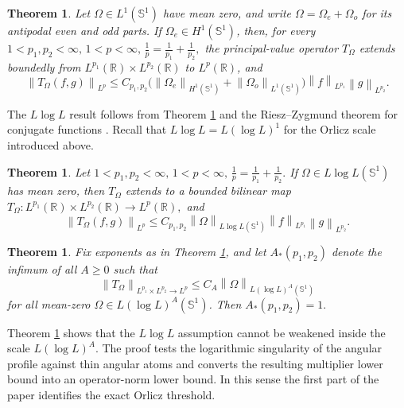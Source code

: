\documentclass[11pt]{amsart}
\newtheorem{theorem}[definition]{Theorem}
\theoremstyle{remark}
\numberwithin{equation}{section}
\newcommand{\R}{\mathbb R}
\newcommand{\Sph}{\mathbb S^1}
\newcommand{\norm}[1]{\left\lVert #1\right\rVert}
\begin{document}
	\begin{theorem}
		\label{thm:rotational-main}
		Let \(\Omega\in L^1(\Sph)\) have mean zero, and write
		\(\Omega=\Omega_e+\Omega_o\) for its antipodal even and odd parts. If 
		\(\Omega_e\in H^1(\Sph)\), then, for every
		$
		1<p_1,p_2<\infty,\,
		1<p<\infty,\,
		\frac1p=\frac1{p_1}+\frac1{p_2},
		$
		the principal-value operator \(T_\Omega\) extends boundedly from
		\(L^{p_1}(\R)\times L^{p_2}(\R)\) to \(L^p(\R)\), and
		\[
		\norm{T_\Omega(f,g)}_{L^p}
		\le
		C_{p_1,p_2}
		\bigl(\norm{\Omega_e}_{H^1(\Sph)}
		+\norm{\Omega_o}_{L^1(\Sph)}\bigr)
		\norm f_{L^{p_1}}\norm g_{L^{p_2}}.
		\]
	\end{theorem}
	
	The \(L\log L\) result follows from Theorem \ref{thm:rotational-main} and the
	Riesz--Zygmund theorem for conjugate functions \cite{Zygmund1959}.  Recall that
	\(L\log L=L(\log L)^1\) for the Orlicz scale introduced above.
	
	\begin{theorem}\label{thm:LlogL-main}
		Let
		$
		1<p_1,p_2<\infty,\,
		1<p<\infty,\,
		\frac1p=\frac1{p_1}+\frac1{p_2}.
		$
		If  \(\Omega\in L\log L(\Sph)\) has mean zero, then
		\(T_\Omega\) extends to a bounded bilinear map
		$
		T_\Omega:L^{p_1}(\R)\times L^{p_2}(\R)\to L^p(\R),
		$
		and
		\[
		\norm{T_\Omega(f,g)}_{L^p}
		\le
		C_{p_1,p_2}\norm{\Omega}_{L\log L(\Sph)}
		\norm f_{L^{p_1}}\norm g_{L^{p_2}}.
		\]
	\end{theorem}
	
	\begin{theorem}\label{thm:Orlicz-sharp}
		Fix exponents as in Theorem \ref{thm:LlogL-main}, and let \(A_*(p_1,p_2)\)
		denote the infimum of all \(A\ge0\) such that
		\[
		\norm{T_\Omega}_{L^{p_1}\times L^{p_2}\to L^p}
		\le
		C_A\norm{\Omega}_{L(\log L)^A(\Sph)}
		\]
		for all mean-zero \(\Omega\in L(\log L)^A(\Sph)\). Then
		$
		A_*(p_1,p_2)=1.
		$
	\end{theorem}
	
	Theorem \ref{thm:Orlicz-sharp} shows that the \(L\log L\) assumption cannot be
	weakened inside the scale \(L(\log L)^A\).  The proof tests the logarithmic
	singularity of the angular profile against thin angular atoms and converts the
	resulting multiplier lower bound into an operator-norm lower bound.  In this
	sense the first part of the paper identifies the exact Orlicz threshold.
	
\end{document}
